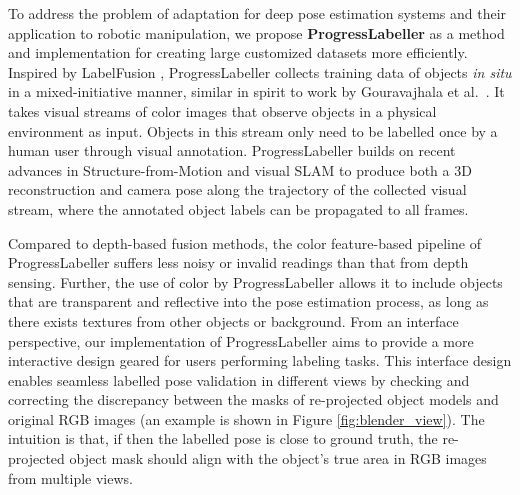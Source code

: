 To address the problem of adaptation for deep pose estimation systems and their application to robotic manipulation, we propose \textbf{ProgressLabeller} as a method and implementation for creating large customized datasets more efficiently. 
Inspired by LabelFusion \cite{marion2018label}, ProgressLabeller collects training data of objects {\it in situ} in a mixed-initiative manner, similar in spirit to work by Gouravajhala et al.~\cite{gouravajhala2018eureca}.  It takes visual streams of color images that observe objects in a physical environment as input.  Objects in this stream only need to be labelled once by a human user through visual annotation. ProgressLabeller builds on recent advances in Structure-from-Motion \cite{schonberger2016structure} and visual SLAM \cite{mur2017orb} to produce both a 3D reconstruction and camera pose along the trajectory of the collected visual stream, where the  annotated object labels can be propagated to all frames.   

Compared to depth-based fusion methods, the color feature-based pipeline of ProgressLabeller suffers less noisy or invalid readings than that from depth sensing.  Further, the use of color by ProgressLabeller allows it to include objects that are transparent and reflective \cite{liu2021stereobj} into the pose estimation process,  as long as there exists textures from other objects or background.  From an interface perspective, our implementation of  ProgressLabeller aims to provide a more interactive design geared for users performing labeling tasks.  This interface design enables seamless labelled pose validation in different views by checking and correcting the discrepancy between the masks of re-projected object models and original RGB images (an example is shown in Figure \ref{fig:blender_view}). The intuition is that, if then the labelled pose is close to ground truth, the re-projected object mask should align with the object's true area in RGB images from multiple views.%


